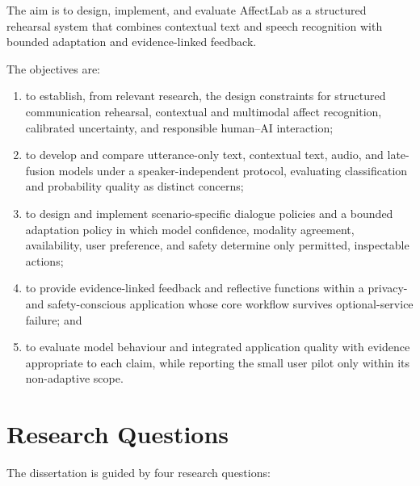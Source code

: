 The aim is to design, implement, and evaluate AffectLab as a structured rehearsal system that combines contextual text and speech recognition with bounded adaptation and evidence-linked feedback.

The objectives are:

\begin{enumerate}[itemsep=0.2em, topsep=0.4em, parsep=0pt]
    \item to establish, from relevant research, the design constraints for structured communication rehearsal, contextual and multimodal affect recognition, calibrated uncertainty, and responsible human--AI interaction;
    \item to develop and compare utterance-only text, contextual text, audio, and late-fusion models under a speaker-independent protocol, evaluating classification and probability quality as distinct concerns;
    \item to design and implement scenario-specific dialogue policies and a bounded adaptation policy in which model confidence, modality agreement, availability, user preference, and safety determine only permitted, inspectable actions;
    \item to provide evidence-linked feedback and reflective functions within a privacy- and safety-conscious application whose core workflow survives optional-service failure; and
    \item to evaluate model behaviour and integrated application quality with evidence appropriate to each claim, while reporting the small user pilot only within its non-adaptive scope.
\end{enumerate}

\section{Research Questions}
\label{sec:research-questions}

The dissertation is guided by four research questions:

